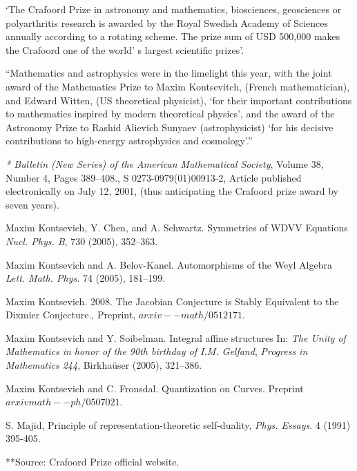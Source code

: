 \documentclass[12pt]{article}
\theoremstyle{plain}
\theoremstyle{definition}
\numberwithin{equation}{section}
\begin{document}
`The Crafoord Prize in astronomy and mathematics, biosciences, geosciences or polyarthritis research is awarded by the Royal Swedish Academy of Sciences annually according to a rotating scheme. The prize sum of USD 500,000 makes the Crafoord one of the world' s largest scientific prizes'.

``Mathematics and astrophysics were in the limelight this year, with the joint award of the Mathematics Prize to Maxim Kontsevitch, (French mathematician), and Edward Witten, (US theoretical physicist), `for their important contributions to mathematics inspired by modern theoretical physics', and the award of the Astronomy Prize to Rashid Alievich Sunyaev (astrophysicist) `for his decisive contributions to high-energy astrophysics and cosmology'.''

\begin{thebibliography}{99}

\emph{* Bulletin (New Series) of the American Mathematical Society}, Volume 38, Number 4, Pages 389--408., S 0273-0979(01)00913-2, Article published electronically on July 12, 2001, (thus anticipating the Crafoord prize award by seven years).

Maxim Kontsevich, Y. Chen, and A. Schwartz. Symmetries of WDVV Equations
{\em Nucl. Phys. B}, 730 (2005), 352--363.

Maxim Kontsevich and A. Belov-Kanel. Automorphisms of the Weyl Algebra
{\em Lett. Math. Phys.} 74 (2005), 181--199.

Maxim Kontsevich. 2008. The Jacobian Conjecture is Stably Equivalent to the Dixmier Conjecture., Preprint, $arxiv--math/0512171$.

Maxim Kontsevich and Y. Soibelman. Integral affine structures
In: \emph{The Unity of Mathematics in honor of the 90th birthday of I.M. Gelfand}, {\em Progress in Mathematics 244}, Birkha\"user (2005), 321--386.

Maxim Kontsevich and C. Fronsdal. Quantization on Curves. Preprint 
$arxiv math--ph/0507021$.

S. Majid, Principle of representation-theoretic self-duality, 
\emph{Phys. Essays}. 4 (1991) 395-405.

\end{thebibliography}


**Source: Crafoord Prize official website.

\end{document}
